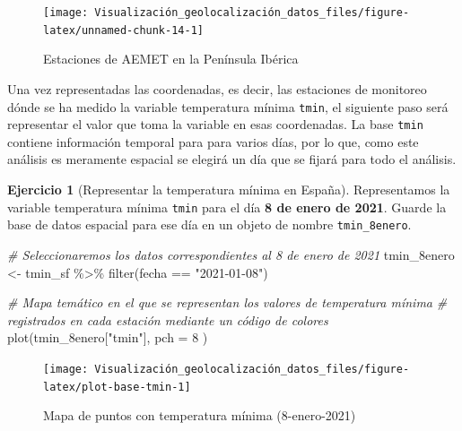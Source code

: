 \documentclass[
]{book}
\newenvironment{Shaded}{\begin{snugshade}}{\end{snugshade}}
\newcommand{\AttributeTok}[1]{\textcolor[rgb]{0.77,0.63,0.00}{#1}}
\newcommand{\CommentTok}[1]{\textcolor[rgb]{0.56,0.35,0.01}{\textit{#1}}}
\newcommand{\DecValTok}[1]{\textcolor[rgb]{0.00,0.00,0.81}{#1}}
\newcommand{\FunctionTok}[1]{\textcolor[rgb]{0.00,0.00,0.00}{#1}}
\newcommand{\NormalTok}[1]{#1}
\newcommand{\OtherTok}[1]{\textcolor[rgb]{0.56,0.35,0.01}{#1}}
\newcommand{\SpecialCharTok}[1]{\textcolor[rgb]{0.00,0.00,0.00}{#1}}
\newcommand{\StringTok}[1]{\textcolor[rgb]{0.31,0.60,0.02}{#1}}
\theoremstyle{definition}
\theoremstyle{definition}
\theoremstyle{definition}
\newtheorem{exercise}{Ejercicio}[chapter]
\theoremstyle{definition}
\theoremstyle{remark}
\begin{document}
\begin{figure}

{\centering \texttt{[image: Visualización\_geolocalización\_datos\_files/figure-latex/unnamed-chunk-14-1]} 

}

\caption{Estaciones de AEMET en la Península Ibérica}\label{fig:unnamed-chunk-14}
\end{figure}

Una vez representadas las coordenadas, es decir, las estaciones de monitoreo
dónde se ha medido la variable temperatura mínima \texttt{tmin}, el siguiente paso será
representar el valor que toma la variable en esas coordenadas. La base \texttt{tmin}
contiene información temporal para para varios días, por lo que, como este
análisis es meramente espacial se elegirá un día que se fijará para todo el
análisis.

\begin{exercise}[Representar la temperatura mínima en España]
\protect\hypertarget{exr:ex10}{}\label{exr:ex10}Representamos la variable temperatura mínima \texttt{tmin} para el día \textbf{8 de enero de
2021}. Guarde la base de datos espacial para ese día en un objeto de nombre
\texttt{tmin\_8enero}.
\end{exercise}

\begin{Shaded}
\begin{Highlighting}[]

\CommentTok{\# Seleccionaremos los datos correspondientes al 8 de enero de 2021}
\NormalTok{tmin\_8enero }\OtherTok{\textless{}{-}}\NormalTok{ tmin\_sf }\SpecialCharTok{\%\textgreater{}\%}
  \FunctionTok{filter}\NormalTok{(fecha }\SpecialCharTok{==} \StringTok{"2021{-}01{-}08"}\NormalTok{)}


\CommentTok{\# Mapa temático en el que se representan los valores de temperatura mínima}
\CommentTok{\# registrados en cada estación mediante un código de colores}
\FunctionTok{plot}\NormalTok{(tmin\_8enero[}\StringTok{"tmin"}\NormalTok{],}
  \AttributeTok{pch =} \DecValTok{8}
\NormalTok{)}
\end{Highlighting}
\end{Shaded}

\begin{figure}

{\centering \texttt{[image: Visualización\_geolocalización\_datos\_files/figure-latex/plot-base-tmin-1]} 

}

\caption{Mapa de puntos con temperatura mínima (8-enero-2021)}\label{fig:plot-base-tmin}
\end{figure}
\end{document}
